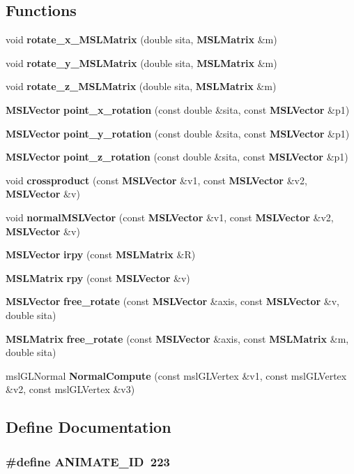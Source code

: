 \subsection*{Functions}
\begin{CompactItemize}
\item 
void {\bf rotate\_\-x\_\-MSLMatrix} (double sita, {\bf MSLMatrix} \&m)
\item 
void {\bf rotate\_\-y\_\-MSLMatrix} (double sita, {\bf MSLMatrix} \&m)
\item 
void {\bf rotate\_\-z\_\-MSLMatrix} (double sita, {\bf MSLMatrix} \&m)
\item 
{\bf MSLVector} {\bf point\_\-x\_\-rotation} (const double \&sita, const {\bf MSLVector} \&p1)
\item 
{\bf MSLVector} {\bf point\_\-y\_\-rotation} (const double \&sita, const {\bf MSLVector} \&p1)
\item 
{\bf MSLVector} {\bf point\_\-z\_\-rotation} (const double \&sita, const {\bf MSLVector} \&p1)
\item 
void {\bf crossproduct} (const {\bf MSLVector} \&v1, const {\bf MSLVector} \&v2, {\bf MSLVector} \&v)
\item 
void {\bf normal\-MSLVector} (const {\bf MSLVector} \&v1, const {\bf MSLVector} \&v2, {\bf MSLVector} \&v)
\item 
{\bf MSLVector} {\bf irpy} (const {\bf MSLMatrix} \&R)
\item 
{\bf MSLMatrix} {\bf rpy} (const {\bf MSLVector} \&v)
\item 
{\bf MSLVector} {\bf free\_\-rotate} (const {\bf MSLVector} \&axis, const {\bf MSLVector} \&v, double sita)
\item 
{\bf MSLMatrix} {\bf free\_\-rotate} (const {\bf MSLVector} \&axis, const {\bf MSLMatrix} \&m, double sita)
\item 
msl\-GLNormal {\bf Normal\-Compute} (const msl\-GLVertex \&v1, const msl\-GLVertex \&v2, const msl\-GLVertex \&v3)
\end{CompactItemize}


\subsection{Define Documentation}
\subsubsection{\setlength{\rightskip}{0pt plus 5cm}\#define ANIMATE\_\-ID\ 223}\label{renderglobj_8h_a35}


